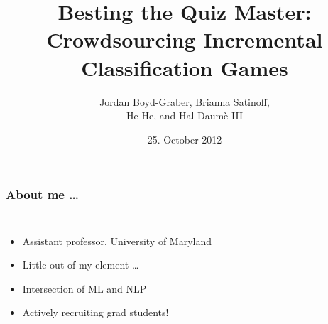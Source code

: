 \documentclass[compress]{beamer}
\title{ Besting the Quiz Master: \\
Crowdsourcing Incremental Classification Games }
\author{Jordan Boyd-Graber, Brianna Satinoff, \\ He He, and Hal Daum\`e III}
\date{25. October 2012}
\begin{document}



\begin{frame}
  \frametitle{About me \dots}

  \begin{columns}


  \begin{itemize}
    \item Assistant professor, University of Maryland
    \item Little out of my element \dots
    \item Intersection of ML and NLP
    \item Actively recruiting grad students!
  \end{itemize}




    \end{columns}


\end{frame}
\end{document}
